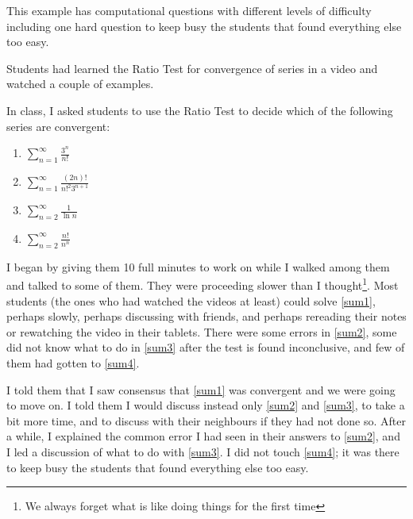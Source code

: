 \documentclass[11pt]{article}
\newcommand {\DS} [1] {${\displaystyle #1}$}
\begin{document}
\begin{example}
This example has computational questions with different levels of difficulty including one hard question to keep busy the students that found everything else too easy.
%
\begin{background}
Students had learned the Ratio Test for convergence of series in a video and watched a couple of examples. 
\end{background}
\begin{question}
 In class, I asked students to use the Ratio Test to decide which of the following series are convergent:
\begin{center}


\begin{minipage}{0.7\textwidth}
\begin{multicols}{2}
\begin{enumerate}[label=(\arabic*)]
\item \DS{\sum_{n=1}^\infty \frac{3^n}{n!}} \label{sum1}
\item \DS{\sum_{n=1}^\infty \frac{(2n)!}{n!^2 3^{n+1}}} \label{sum2}
\item \DS{\sum_{n=2}^\infty \frac{1}{\ln n}} \label{sum3}
\item \DS{\sum_{n=2}^\infty \frac{n!}{n^n}} \label{sum4}
\end{enumerate}
\end{multicols}
\end{minipage}
\end{center}

\vspace{1mm}
\end{question}
\begin{comments}
I began by giving them 10 full minutes to work on while I walked among them and talked to some of them.   They were proceeding slower than I thought\footnote{We always forget what is like doing things for the first time}.  Most students (the ones who had watched the videos at least) could solve \ref{sum1}, perhaps slowly, perhaps discussing with friends, and perhaps rereading their notes or rewatching the video in their tablets.  There were some errors in \ref{sum2}, some did not know what to do in \ref{sum3} after the test is found inconclusive, and few of them had gotten to \ref{sum4}. 

{\baselineskip
I told them that I saw consensus that \ref{sum1} was convergent and we were going to move on.   I told them I would discuss instead only \ref{sum2} and \ref{sum3}, to take a bit more time, and to discuss with their neighbours if they had not done so.  After a while, I explained the common error I had seen in their answers to \ref{sum2}, and I led a discussion of what to do with \ref{sum3}.  I did not touch \ref{sum4}; it was there to keep busy the students that found everything else too easy.
}
\end{comments}
\end{example}
\end{document}
